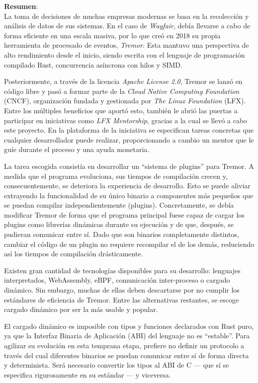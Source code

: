 \documentclass[a4paper,12pt,twoside,hidelinks,openright]{article}
\begin{document}
\textbf{Resumen}:\\ La toma de decisiones de muchas empresas modernas se basa en
la recolección y análisis de datos de sus sistemas. En el caso de
\emph{Wayfair}, debía llevarse a cabo de forma eficiente en una escala masiva,
por lo que creó en 2018 su propia herramienta de procesado de eventos,
\emph{Tremor}. Esta mantuvo una perspectiva de alto rendimiento desde el inicio,
siendo escrita con el lenguaje de programación compilado Rust, concurrencia
asíncrona con hilos y SIMD.

Posteriormente, a través de la licencia \emph{Apache License 2.0}, Tremor se
lanzó en código libre y pasó a formar parte de la \emph{Cloud Native Computing
Foundation} (CNCF), organización fundada y gestionada por \emph{The Linux
Foundation} (LFX). Entre los múltiples beneficios que aportó esto, también le
abrió las puertas a participar en iniciativas como \emph{LFX Mentorship},
gracias a la cual se llevó a cabo este proyecto. En la plataforma de la
iniciativa se especifican tareas concretas que cualquier desarrollador puede
realizar, proporcionando a cambio un mentor que le guíe durante el proceso y una
ayuda monetaria.

La tarea escogida consistía en desarrollar un ``sistema de plugins'' para
Tremor. A medida que el programa evoluciona, sus tiempos de compilación crecen
y, consecuentemente, se deteriora la experiencia de desarrollo. Esto se puede
aliviar extrayendo la funcionalidad de su único binario a componentes más
pequeños que se puedan compilar independientemente (plugins).
Concretamente, se debía modificar Tremor de forma que el programa principal
fuese capaz de cargar los plugins como librerías dinámicas durante su ejecución
y de que, después, se pudieran comunicar entre sí. Dado que son binarios
completamente distintos, cambiar el código de un plugin no requiere recompilar
el de los demás, reduciendo así los tiempos de compilación drásticamente.

Existen gran cantidad de tecnologías disponibles para su desarrollo: lenguajes
interpretados, WebAssembly, eBPF, comunicación inter-proceso o cargado dinámico.
Sin embargo, muchas de ellas deben descartarse por no cumplir los estándares de
eficiencia de Tremor. Entre las alternativas restantes, se escoge cargado
dinámico por ser la más usable y popular.

El cargado dinámico es imposible con tipos y funciones declarados con Rust puro,
ya que la Interfaz Binaria de Aplicación (ABI) del lenguaje no es ``estable''.
Para agilizar su evolución en esta temprana etapa, prefiere no definir un
protocolo a través del cual diferentes binarios se puedan comunicar entre sí de
forma directa y determinista. Será necesario convertir los tipos al ABI de C ---
que sí se especifica rigurosamente en su estándar --- y viceversa.
\end{document}
